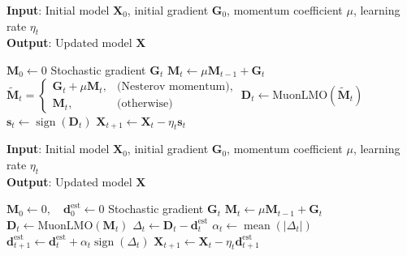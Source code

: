 \documentclass[letterpaper]{article} %
\begin{document}
\begin{algorithm}
\caption{Centralized SignMuon}
\label{central_alg}
\textbf{Input}: Initial model $\mathbf{X}_0$, initial gradient $\mathbf{G}_0$, momentum coefficient $\mu$, learning rate $\eta_t$ \\
\textbf{Output}: Updated model $\mathbf{X}$ 
\begin{algorithmic}[1]
\State $\mathbf{M}_0 \gets 0$ 
    \State Stochastic gradient $\mathbf{G}_t$
    \State $\mathbf{M}_t \gets \mu \mathbf{M}_{t-1} + \mathbf{G}_t$ 
    \State $\tilde{\mathbf{M}}_t =
    \begin{cases} 
        \mathbf{G}_t + \mu \mathbf{M}_t, & \text{(Nesterov momentum)}, \\
        \mathbf{M}_t, & \text{(otherwise)}
    \end{cases}$
    \State $\mathbf{D}_t \gets \mathrm{MuonLMO}(\tilde{\mathbf{M}}_t)$ 
    \State $\mathbf{s}_t \gets \operatorname{sign}(\mathbf{D}_t)$ 
    \State $\mathbf{X}_{t+1} \gets \mathbf{X}_t - \eta_t \mathbf{s}_t$ 
\EndFor
\end{algorithmic}
\end{algorithm}


\begin{algorithm}[!ht]
    \caption{Centralized EF21-SignMuon}
    \label{alg:central_ef21_signmuon}
    \textbf{Input}: Initial model $\mathbf{X}_0$, initial gradient $\mathbf{G}_0$, momentum coefficient $\mu$, learning rate $\eta_t$ \\
    \textbf{Output}: Updated model $\mathbf{X}$
    \begin{algorithmic}[1]
    \State $\mathbf{M}_0 \gets 0,\quad \mathbf{d}_0^{\mathrm{est}} \gets 0$
      \State Stochastic gradient $\mathbf{G}_t$
      \State $\mathbf{M}_t \gets \mu\mathbf{M}_{t-1} + \mathbf{G}_t$ 
      \State $\mathbf{D}_t \gets \mathrm{MuonLMO}(\mathbf{M}_t)$ 
      \State $\Delta_t \gets \mathbf{D}_t - \mathbf{d}_t^{\mathrm{est}}$ 
      \State $\alpha_t \gets \operatorname{mean}(|\Delta_t|)$ 
      \State $\mathbf{d}_{t+1}^{\mathrm{est}} \gets \mathbf{d}_t^{\mathrm{est}} + \alpha_t\operatorname{sign}(\Delta_t)$ 
      \State $\mathbf{X}_{t+1} \gets \mathbf{X}_t - \eta_t\mathbf{d}_{t+1}^{\mathrm{est}}$ 
    \EndFor
    \end{algorithmic}
\end{algorithm}
\end{document}
